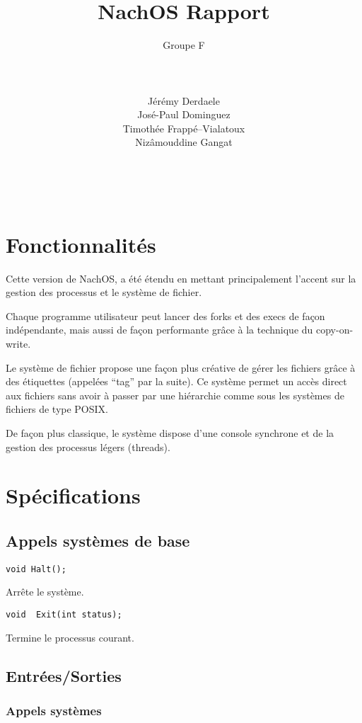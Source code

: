 \documentclass{article}
\title{NachOS Rapport}
\author{
    Groupe F \\
  {\rule{5cm}{0.4pt}}\\
  Jérémy Derdaele\\
  José-Paul Dominguez\\
  Timothée Frappé--Vialatoux\\
  Nizâmouddine Gangat\\
  {\rule{5cm}{0.4pt}}\\
}
\begin{document}
\maketitle

\tableofcontents

\newpage

\section{Fonctionnalités}

Cette version de NachOS, a été étendu en mettant principalement l'accent sur la gestion des processus et le système de fichier.

Chaque programme utilisateur peut lancer des forks et des execs de façon indépendante, mais aussi de façon performante grâce à la technique du copy-on-write.

Le système de fichier propose une façon plus créative de gérer les fichiers grâce à des étiquettes (appelées ``tag'' par la suite). Ce système permet un accès direct aux fichiers sans avoir à passer par une hiérarchie comme sous les systèmes de fichiers de type POSIX.

De façon plus classique, le système dispose d'une console synchrone et de la gestion des processus légers (threads).

\section{Spécifications}

\subsection{Appels systèmes de base}

\begin{verbatim}
void Halt();
\end{verbatim}
Arrête le système.

\begin{verbatim}
void  Exit(int status);
\end{verbatim}
Termine le processus courant.
\subsection{Entrées/Sorties}

\subsubsection{Appels systèmes}
\end{document}
